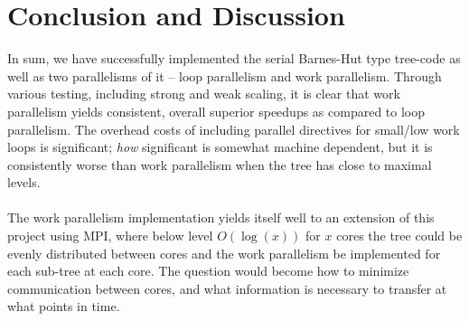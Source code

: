 \documentclass{article}
\begin{document}
\section{Conclusion and Discussion}
In sum, we have successfully implemented the serial Barnes-Hut type tree-code as well as two parallelisms of it -- loop parallelism and work parallelism. Through various testing, including strong and weak scaling, it is clear that work parallelism yields consistent, overall superior speedups as compared to loop parallelism. The overhead costs of including parallel directives for small/low work loops is significant; \emph{how} significant is somewhat machine dependent, but it is consistently worse than work parallelism when the tree has close to maximal levels.\\\\
The work parallelism implementation yields itself well to an extension of this project using MPI, where below level $O(\log(x))$ for $x$ cores the tree could be evenly distributed between cores and the work parallelism be implemented for each sub-tree at each core. The question would become how to minimize communication between cores, and what information is necessary to transfer at what points in time. 





\end{document}

